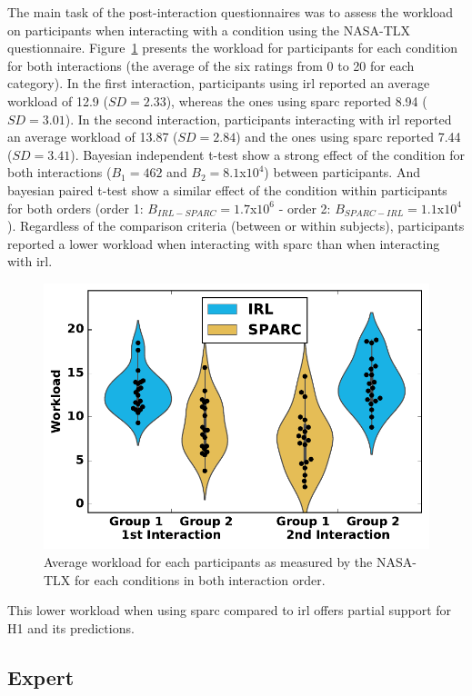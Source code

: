 The main task of the post-interaction questionnaires was to assess the workload on participants when interacting with a condition using the NASA-TLX questionnaire. Figure~\ref{fig:control_workload} presents the workload for participants for each condition for both interactions (the average of the six ratings from 0 to 20 for each category). In the first interaction, participants using \gls{irl} reported an average workload of 12.9 ($SD=2.33$), whereas the ones using \gls{sparc} reported 8.94 ($SD=3.01$). In the second interaction, participants interacting with \gls{irl} reported an average workload of 13.87 ($SD=2.84$) and the ones using \gls{sparc} reported 7.44 ($SD=3.41$). Bayesian independent t-test show a strong effect of the condition for both interactions ($B_1=462$ and $B_2=8.1$x$10^4$) between participants. And bayesian paired t-test show a similar effect of the condition within participants for both orders (order 1: $B_{IRL-SPARC}=1.7$x$10^6$ - order 2: $B_{SPARC-IRL}=1.1$x$10^4$). Regardless of the comparison criteria (between or within subjects), participants reported a lower workload when interacting with \gls{sparc} than when interacting with \gls{irl}.

\begin{figure}[ht]
	\includegraphics[width=.8\textwidth]{workload.pdf}
	\centering
	\caption{Average workload for each participants as measured by the NASA-TLX for each conditions in both interaction order.
	}
	\label{fig:control_workload}
\end{figure}

This lower workload when using \gls{sparc} compared to \gls{irl} offers partial support for H1 and its predictions.

\subsection{Expert} \label{ssec:control_expert}

